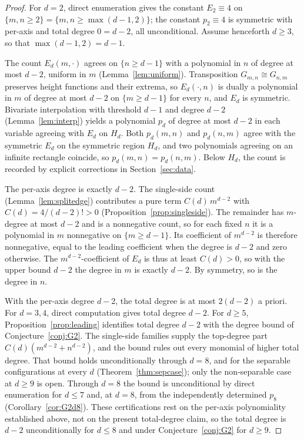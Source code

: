 \documentclass[11pt]{article}
\theoremstyle{definition}
\theoremstyle{remark}
\newcommand{\Gmn}{G_{m,n}}
\begin{document}
\begin{proof}
For $d=2$, direct enumeration gives the constant $E_2\equiv4$ on
$\{m,n\ge2\}=\{m,n\ge\max(d-1,2)\}$; the constant $p_2\equiv4$ is symmetric with
per-axis and total degree $0=d-2$, all unconditional. Assume henceforth
$d\ge3$, so that $\max(d-1,2)=d-1$.

\medskip\noindent
The count $E_d(m,\cdot)$ agrees on $\{n\ge d-1\}$ with a polynomial in $n$ of
degree at most $d-2$, uniform in $m$ (Lemma~\ref{lem:uniform}). Transposition
$\Gmn\cong G_{n,m}$ preserves height functions and their extrema, so
$E_d(\cdot,n)$ is dually a polynomial in $m$ of degree at most $d-2$ on
$\{m\ge d-1\}$ for every $n$, and $E_d$ is symmetric. Bivariate interpolation
with threshold $d-1$ and degree $d-2$ (Lemma~\ref{lem:interp}) yields a
polynomial $p_d$ of degree at most $d-2$ in each variable agreeing with $E_d$ on
$H_d$. Both $p_d(m,n)$ and $p_d(n,m)$ agree with the symmetric $E_d$ on the symmetric
region $H_d$, and two polynomials agreeing on an infinite rectangle coincide, so
$p_d(m,n)=p_d(n,m)$. Below $H_d$, the count is recorded by
explicit corrections in Section~\ref{sec:data}.

\medskip\noindent
The per-axis degree is exactly $d-2$. The single-side count
(Lemma~\ref{lem:splitedge}) contributes a pure term
$C(d)\,m^{d-2}$ with $C(d)=4/(d-2)!>0$ (Proposition~\ref{prop:singleside}). The remainder has $m$-degree at most
$d-2$ and is a nonnegative count, so for each fixed $n$ it is a polynomial in $m$
nonnegative on $\{m\ge d-1\}$. Its coefficient of $m^{d-2}$ is therefore nonnegative,
equal to the leading coefficient when the degree is $d-2$ and zero otherwise. The $m^{d-2}$-coefficient of $E_d$ is
thus at least $C(d)>0$, so with the upper bound $d-2$ the degree in $m$ is
exactly $d-2$. By symmetry, so is the degree in $n$.

\medskip\noindent
With the per-axis degree $d-2$, the total degree is at most $2(d-2)$ a priori.
For $d=3,4$, direct computation gives total degree $d-2$. For $d\ge5$,
Proposition~\ref{prop:leading} identifies total degree $d-2$ with the degree bound
of Conjecture~\ref{conj:G2}. The single-side families supply the top-degree part
$C(d)(m^{d-2}+n^{d-2})$, and the bound rules out every monomial of higher total
degree. That bound holds unconditionally through $d=8$, and for the separable configurations at every $d$
(Theorem~\ref{thm:sepcase}); only the non-separable case at $d\ge9$ is open. Through
$d=8$ the bound is unconditional by direct enumeration for $d\le7$ and, at $d=8$, from
the independently determined $p_8$ (Corollary~\ref{cor:G2d8}). These certifications rest on the per-axis
polynomiality established above, not on the present total-degree claim, so the
total degree is $d-2$ unconditionally for $d\le8$ and under
Conjecture~\ref{conj:G2} for $d\ge9$.
\end{proof}
\end{document}
